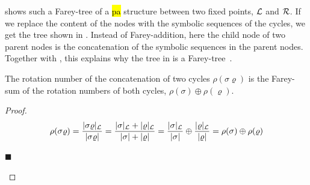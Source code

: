  shows such a Farey-tree of a \hl{\gls{pa}} structure between two fixed points, $\mathcal{L}$ and $\mathcal{R}$.
If we replace the content of the nodes with the symbolic sequences of the cycles, we get the tree shown in .
Instead of Farey-addition, here the child node of two parent nodes is the concatenation of the symbolic sequences in the parent nodes.
Together with , this explains why the  tree in  is a Farey-tree~\cite{granados14adding}.

\begin{theorem}
	The rotation number of the concatenation of two cycles $\rho(\sigma\varrho)$ is the Farey-sum of the rotation numbers of both cycles, $\rho(\sigma) \oplus \rho(\varrho)$.
	\label{theorem:state.rot.num.concat}
\end{theorem}

\begin{proof}
	\begin{align*}
		\rho(\sigma\varrho)
		= \dfrac{|\sigma\varrho|_{\mathcal{L}}}{|\sigma\varrho|}
		= \dfrac{|\sigma|_{\mathcal{L}} + |\varrho|_{\mathcal{L}}}{|\sigma| + |\varrho|}
		= \dfrac{|\sigma|_{\mathcal{L}}}{|\sigma|} \oplus \dfrac{|\varrho|_{\mathcal{L}}}{|\varrho|}
		= \rho(\sigma) \oplus \rho(\varrho)
	\end{align*}
	\vspace{-4.8em}
	\begin{flushright}
		$\blacksquare$
	\end{flushright}
\end{proof}


